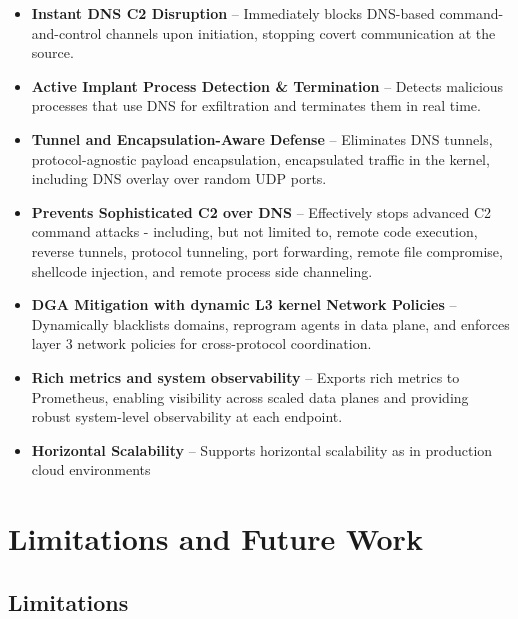 \documentclass [11pt, proquest] {uwthesis}[2020/02/24]
\begin{document}
\begin{itemize}[nosep]
    \item \textbf{Instant DNS C2 Disruption} – Immediately blocks DNS-based command-and-control channels upon initiation, stopping covert communication at the source.

    \item \textbf{Active Implant Process Detection \& Termination} – Detects malicious processes that use DNS for exfiltration and terminates them in real time.

    \item \textbf{Tunnel and Encapsulation-Aware Defense} – Eliminates DNS tunnels, protocol-agnostic payload encapsulation, encapsulated traffic in the kernel, including DNS overlay over random UDP ports.

    \item \textbf{Prevents Sophisticated C2 over DNS} – Effectively stops advanced C2 command attacks - including, but not limited to, remote code execution, reverse tunnels, protocol tunneling, port forwarding, remote file compromise, shellcode injection, and remote process side channeling.

    \item \textbf{DGA Mitigation with dynamic L3 kernel Network Policies} – Dynamically blacklists  domains, reprogram agents in data plane, and enforces layer 3 network policies for cross-protocol coordination.

    \item \textbf{Rich metrics and system observability} – Exports rich metrics to Prometheus, enabling visibility across scaled data planes and providing robust system-level observability at each endpoint.

    \item \textbf{Horizontal Scalability} – Supports horizontal scalability as in production cloud environments 

\end{itemize}

\section*{Limitations and Future Work}

\subsection*{Limitations}
\end{document}
